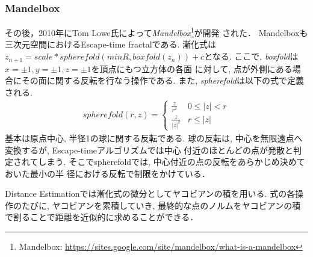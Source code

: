\subsubsection{Mandelbox}
その後，2010年にTom Lowe氏によって{\it Mandelbox}\footnote{Mandelbox:
\url{https://sites.google.com/site/mandelbox/what-is-a-mandelbox}}が開発
された．
Mandelboxも三次元空間におけるEscape-time fractalである.
漸化式は$z_{n+1} = scale * spherefold(minR, boxfold(z_n)) + c$となる.
ここで, {\it boxfold}は$x=\pm1, y=\pm1, z=\pm1$を頂点にもつ立方体の各面
に対して, 点が外側にある場合にその面に関する反転を行なう操作である.
また, {\it spherefold}は以下の式で定義される.
\begin{eqnarray*}
 spherefold(r, z) = \begin{cases}
                  \frac{z}{r^2} & 0 \le |z| < r \\
                  \frac{z}{|z|^2} & r \le |z|
                 \end{cases}
\end{eqnarray*}
基本は原点中心, 半径1の球に関する反転である.
球の反転は, 中心を無限遠点へ変換するが, Escape-timeアルゴリズムでは中心
付近のほとんどの点が発散と判定されてしまう.
そこでspherefoldでは, 中心付近の点の反転をあらかじめ決めておいた最小の半
径における反転で制限をかけている．

Distance Estimationでは漸化式の微分としてヤコビアンの積を用いる.
式の各操作のたびに, ヤコビアンを累積していき,
最終的な点のノルムをヤコビアンの積で割ることで距離を近似的に求めることができる．

